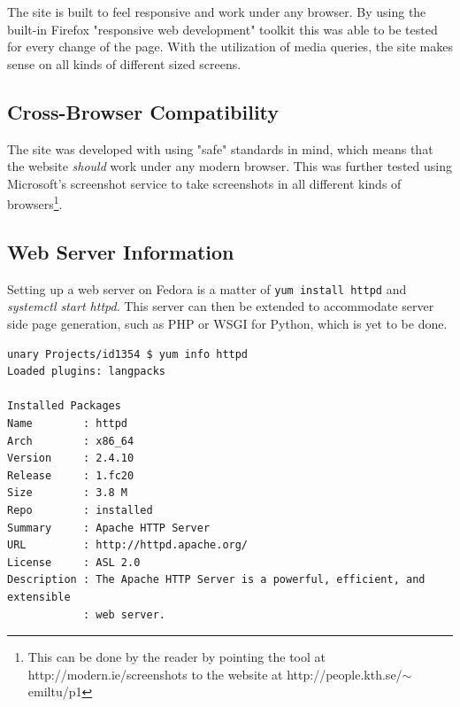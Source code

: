\documentclass[a4paper]{scrartcl}
\begin{document}
The site is built to feel responsive and work under any browser. By using the built-in Firefox "responsive web development" toolkit this was able to be tested for every change of the page. With the utilization of media queries, the site makes sense on all kinds of different sized screens.

\subsection{Cross-Browser Compatibility}

The site was developed with using "safe" standards in mind, which means that the website \textit{should} work under any modern browser. This was further tested using Microsoft's screenshot service to take screenshots in all different kinds of browsers\footnote{This can be done by the reader by pointing the tool at http://modern.ie/screenshots to the website at http://people.kth.se/$\sim$emiltu/p1}.

\subsection{Web Server Information}
\label{subsec:httpd}

Setting up a web server on Fedora is a matter of \texttt{yum install httpd} and \textit{systemctl start httpd}. This server can then be extended to accommodate server side page generation, such as PHP or WSGI for Python, which is yet to be done.

\begin{lstlisting}
unary Projects/id1354 $ yum info httpd                                                                                                       
Loaded plugins: langpacks

Installed Packages
Name        : httpd
Arch        : x86_64
Version     : 2.4.10
Release     : 1.fc20
Size        : 3.8 M
Repo        : installed
Summary     : Apache HTTP Server
URL         : http://httpd.apache.org/
License     : ASL 2.0
Description : The Apache HTTP Server is a powerful, efficient, and extensible
            : web server.
\end{lstlisting}
\end{document}
